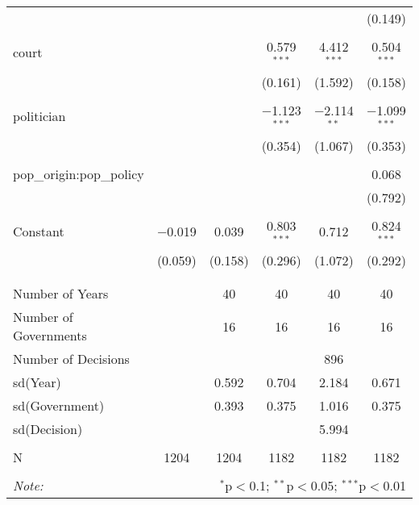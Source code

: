 \begin{table}[!htbp]
\begin{tabular}{@{\extracolsep{5pt}}lccccc}
  &  &  &  &  & (0.149) \\ 
  & & & & & \\ 
 court &  &  & 0.579$^{***}$ & 4.412$^{***}$ & 0.504$^{***}$ \\ 
  &  &  & (0.161) & (1.592) & (0.158) \\ 
  & & & & & \\ 
 politician &  &  & $-$1.123$^{***}$ & $-$2.114$^{**}$ & $-$1.099$^{***}$ \\ 
  &  &  & (0.354) & (1.067) & (0.353) \\ 
  & & & & & \\ 
 pop\_origin:pop\_policy &  &  &  &  & 0.068 \\ 
  &  &  &  &  & (0.792) \\ 
  & & & & & \\ 
 Constant & $-$0.019 & 0.039 & 0.803$^{***}$ & 0.712 & 0.824$^{***}$ \\ 
  & (0.059) & (0.158) & (0.296) & (1.072) & (0.292) \\ 
  & & & & & \\ 
\hline \\[-1.8ex] 
Number of Years &  & 40 & 40 & 40 & 40 \\ 
Number of Governments &  & 16 & 16 & 16 & 16 \\ 
Number of Decisions &  &  &  & 896 &  \\ 
sd(Year) &  & 0.592 & 0.704 & 2.184 & 0.671 \\ 
sd(Government) &  & 0.393 & 0.375 & 1.016 & 0.375 \\ 
sd(Decision) &  &  &  & 5.994 &  \\ 
 &  &  &  &  &  \\ 
N & 1204 & 1204 & 1182 & 1182 & 1182 \\ 
\hline 
\hline \\[-1.8ex] 
\textit{Note:}  & \multicolumn{5}{r}{$^{*}$p$<$0.1; $^{**}$p$<$0.05; $^{***}$p$<$0.01} \\ 
\end{tabular} 
\end{table} 
